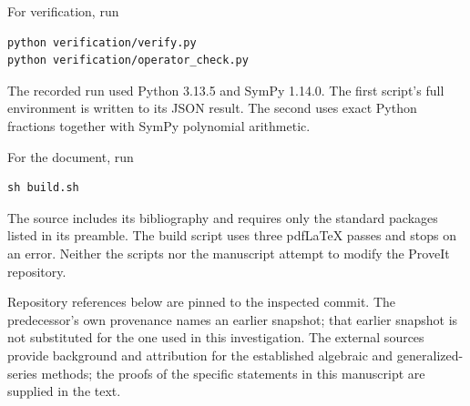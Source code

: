 \documentclass[11pt,a4paper]{article}
\numberwithin{equation}{section}
\theoremstyle{definition}
\theoremstyle{remark}
\theoremstyle{definition}
\begin{document}
For verification, run
\begin{verbatim}
python verification/verify.py
python verification/operator_check.py
\end{verbatim}
The recorded run used Python 3.13.5 and SymPy 1.14.0. The first script's full environment is written to its JSON result. The second uses exact Python fractions together with SymPy polynomial arithmetic.

For the document, run
\begin{verbatim}
sh build.sh
\end{verbatim}
The source includes its bibliography and requires only the standard packages listed in its preamble. The build script uses three pdfLaTeX passes and stops on an error. Neither the scripts nor the manuscript attempt to modify the ProveIt repository.

Repository references below are pinned to the inspected commit. The predecessor's own provenance names an earlier snapshot; that earlier snapshot is not substituted for the one used in this investigation. The external sources provide background and attribution for the established algebraic and generalized-series methods; the proofs of the specific statements in this manuscript are supplied in the text.
\end{document}
